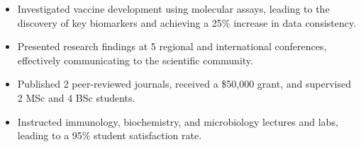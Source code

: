\begin{itemize}
    \setlength{\itemindent}{0.5em}
    \item \small 
    Investigated vaccine development using molecular assays, leading to the discovery of key biomarkers and achieving a 25\% increase in 
    data consistency. %
    \item Presented research findings at 5 regional and international conferences, effectively communicating to the scientific community.
    \item Published 2 peer-reviewed journals, received a \$50,000 grant, and supervised 2 MSc and 4 BSc students.
    \item Instructed immunology, biochemistry, and microbiology lectures and labs, leading to a 95\% student satisfaction rate.

\end{itemize}




